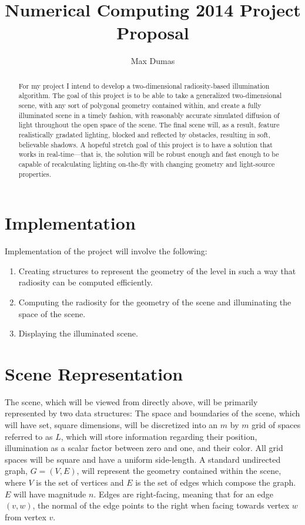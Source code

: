 \documentclass{article}
\begin{document}
\title{Numerical Computing 2014 Project Proposal}
\author{Max Dumas}
\maketitle

\begin{abstract}
For my project I intend to develop a two-dimensional radiosity-based illumination algorithm. The goal of this project is to be able to take a generalized two-dimensional scene, with any sort of polygonal geometry contained within, and create a fully illuminated scene in a timely fashion, with reasonably accurate simulated diffusion of light throughout the open space of the scene. The final scene will, as a result, feature realistically gradated lighting, blocked and reflected by obstacles, resulting in soft, believable shadows. A hopeful stretch goal of this project is to have a solution that works in real-time---that is, the solution will be robust enough and fast enough to be capable of recalculating lighting on-the-fly with changing geometry and light-source properties.
\end{abstract}
\section{Implementation}
Implementation of the project will involve the following:
\begin{enumerate}
\item Creating structures to represent the geometry of the level in such a way that radiosity can be computed efficiently.
\item Computing the radiosity for the geometry of the scene and illuminating the space of the scene.
\item Displaying the illuminated scene.
\end{enumerate}

\section{Scene Representation}
The scene, which will be viewed from directly above, will be primarily represented by two data structures: The space and boundaries of the scene, which will have set, square dimensions, will be discretized into an $m$ by $m$ grid of spaces referred to as $L$, which will store information regarding their position, illumination as a scalar factor between zero and one, and their color. All grid spaces will be square and have a uniform side-length. A standard undirected graph, $G = (V, E)$, will represent the geometry contained within the scene, where $V$ is the set of vertices and $E$ is the set of edges which compose the graph. $E$ will have magnitude $n$. Edges are right-facing, meaning that for an edge $(v, w)$, the normal of the edge points to the right when facing towards vertex $w$ from vertex $v$.
\end{document}
